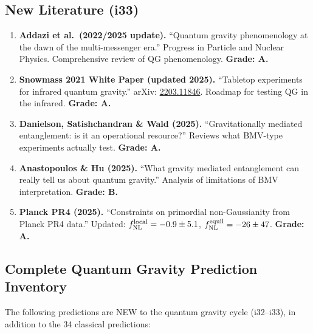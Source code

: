 \documentclass[11pt,a4paper]{article}
\begin{document}
\subsection{New Literature (i33)}

\begin{enumerate}
\item \textbf{Addazi et al.\ (2022/2025 update).} ``Quantum gravity phenomenology at the dawn of the multi-messenger era.'' Progress in Particle and Nuclear Physics. Comprehensive review of QG phenomenology. \textbf{Grade: A.}

\item \textbf{Snowmass 2021 White Paper (updated 2025).} ``Tabletop experiments for infrared quantum gravity.'' arXiv: \href{https://arxiv.org/abs/2203.11846}{2203.11846}. Roadmap for testing QG in the infrared. \textbf{Grade: A.}

\item \textbf{Danielson, Satishchandran \& Wald (2025).} ``Gravitationally mediated entanglement: is it an operational resource?'' Reviews what BMV-type experiments actually test. \textbf{Grade: A.}

\item \textbf{Anastopoulos \& Hu (2025).} ``What gravity mediated entanglement can really tell us about quantum gravity.'' Analysis of limitations of BMV interpretation. \textbf{Grade: B.}

\item \textbf{Planck PR4 (2025).} ``Constraints on primordial non-Gaussianity from Planck PR4 data.'' Updated: $f_{\rm NL}^{\rm local} = -0.9\pm 5.1$, $f_{\rm NL}^{\rm equil} = -26\pm 47$. \textbf{Grade: A.}
\end{enumerate}

\subsection{Complete Quantum Gravity Prediction Inventory}

The following predictions are NEW to the quantum gravity cycle (i32--i33), in addition to the 34 classical predictions:
\end{document}
